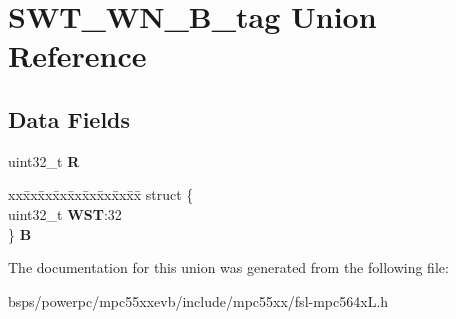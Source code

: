 \hypertarget{unionSWT__WN__32B__tag}{}\section{S\+W\+T\+\_\+\+W\+N\+\_\+B\+\_\+tag Union Reference}
\label{unionSWT__WN__32B__tag}
\subsection*{Data Fields}
\begin{DoxyCompactItemize}
\item 
\mbox{\label{unionSWT__WN__32B__tag_a5bae1aa4a1907fff34a517b06f033a1a}} 
uint32\+\_\+t {\bfseries R}
\item 
\mbox{\label{unionSWT__WN__32B__tag_ab25954ae10a9691141af2b75c84aa02f}} 
\begin{tabbing}
xx\=xx\=xx\=xx\=xx\=xx\=xx\=xx\=xx\=\kill
struct \{\\
\>uint32\_t {\bfseries WST}:32\\
\} {\bfseries B}\\

\end{tabbing}\end{DoxyCompactItemize}


The documentation for this union was generated from the following file\+:\begin{DoxyCompactItemize}
\item 
bsps/powerpc/mpc55xxevb/include/mpc55xx/fsl-\/mpc564x\+L.\+h\end{DoxyCompactItemize}
